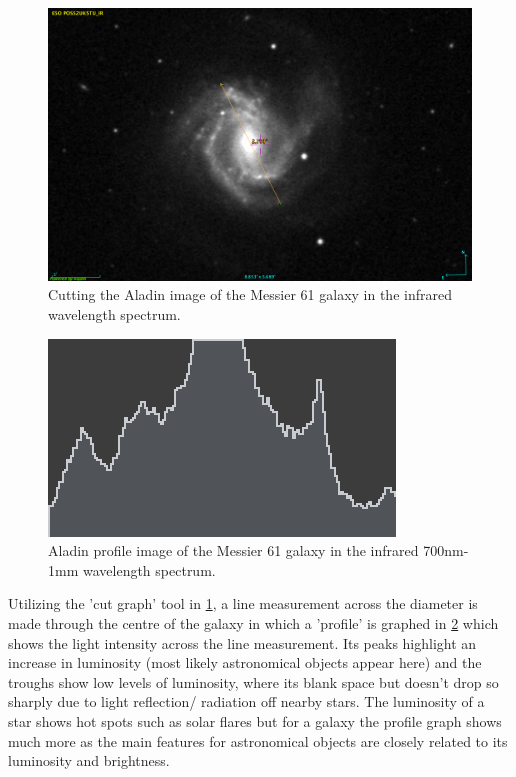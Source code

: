 \documentclass[12pt]{article}
\begin{document}
\begin{multicols}{2}
\begin{figure}[H]
\centering
\includegraphics[scale=0.22]{Images/As_Images/M61Cut.png}
\caption{Cutting the Aladin image of the Messier 61 galaxy in the infrared wavelength spectrum.}
\label{Aladin IR Cut Profile image of the Messier 61 galaxy}
\end{figure}

\begin{figure}[H]
\centering
\includegraphics[scale=1.4]{Images/As_Images/M61Profile.png}
\caption{Aladin profile image of the Messier 61 galaxy in the infrared 700nm-1mm wavelength spectrum.}
\label{Aladin profile image of the Messier 61 galaxy}
\end{figure}
\end{multicols}
\vspace{0.2cm}

Utilizing the 'cut graph' tool in \cref{Aladin IR Cut Profile image of the Messier 61 galaxy}, a line measurement across the diameter is made through the centre of the galaxy in which a 'profile' is graphed in \cref{Aladin profile image of the Messier 61 galaxy} which shows the light intensity across the line measurement. Its peaks highlight an increase in luminosity (most likely astronomical objects appear here) and the troughs show low levels of luminosity, where its blank space but doesn't drop so sharply due to light reflection/ radiation off nearby stars. The luminosity of a star shows hot spots such as solar flares but for a galaxy the profile graph shows much more as the main features for astronomical objects are closely related to its luminosity and brightness.\\
\end{document}
